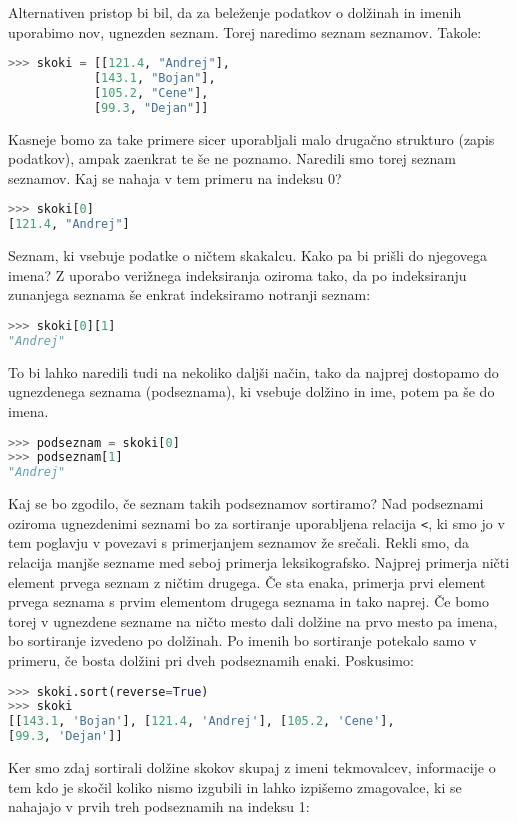 Alternativen pristop bi bil, da za beleženje podatkov o dolžinah in imenih uporabimo nov, ugnezden seznam. Torej naredimo seznam seznamov. Takole:
\begin{lstlisting}[language=Python]
>>> skoki = [[121.4, "Andrej"], 
            [143.1, "Bojan"], 
            [105.2, "Cene"], 
            [99.3, "Dejan"]]
\end{lstlisting}
Kasneje bomo za take primere sicer uporabljali malo drugačno strukturo (zapis podatkov), ampak zaenkrat te še ne poznamo. Naredili smo torej seznam seznamov. Kaj se nahaja v tem primeru na indeksu 0?
\begin{lstlisting}[language=Python]
>>> skoki[0]
[121.4, "Andrej"]
\end{lstlisting}
Seznam, ki vsebuje podatke o ničtem skakalcu. Kako pa bi prišli do njegovega imena? Z uporabo verižnega indeksiranja oziroma tako, da po indeksiranju zunanjega seznama še enkrat indeksiramo notranji seznam:
\begin{lstlisting}[language=Python]
>>> skoki[0][1]
"Andrej"
\end{lstlisting}
To bi lahko naredili tudi na nekoliko daljši način, tako da najprej dostopamo do ugnezdenega seznama (podseznama), ki vsebuje dolžino in ime, potem pa še do imena.
\begin{lstlisting}[language=Python]
>>> podseznam = skoki[0]
>>> podseznam[1]
"Andrej"
\end{lstlisting}
Kaj se bo zgodilo, če seznam takih podseznamov sortiramo? Nad podseznami oziroma ugnezdenimi seznami bo za sortiranje uporabljena relacija \texttt{<}, ki smo jo v tem poglavju v povezavi s primerjanjem seznamov že srečali. Rekli smo, da relacija manjše sezname med seboj primerja leksikografsko. Najprej primerja ničti element prvega seznam z ničtim drugega. Če sta enaka, primerja prvi element prvega seznama s prvim elementom drugega seznama in tako naprej. Če bomo torej v ugnezdene sezname na ničto mesto dali dolžine na prvo mesto pa imena, bo sortiranje izvedeno po dolžinah. Po imenih bo sortiranje potekalo samo v primeru, če bosta dolžini pri dveh podseznamih enaki. Poskusimo:
\begin{lstlisting}[language=Python]
>>> skoki.sort(reverse=True)
>>> skoki
[[143.1, 'Bojan'], [121.4, 'Andrej'], [105.2, 'Cene'],
[99.3, 'Dejan']]
\end{lstlisting}
Ker smo zdaj sortirali dolžine skokov skupaj z imeni tekmovalcev, informacije o tem kdo je skočil koliko nismo izgubili in lahko izpišemo zmagovalce, ki se nahajajo v prvih treh podseznamih na indeksu 1:
